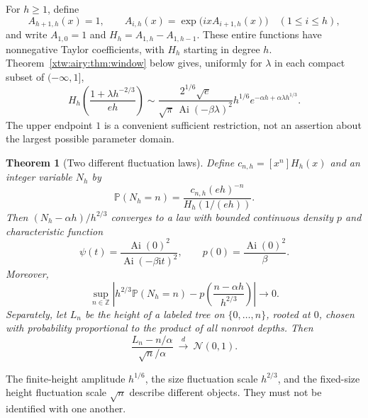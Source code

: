 \documentclass[11pt]{article}
\newtheorem{theorem}{Theorem}[section]
\theoremstyle{remark}\newtheorem{remark}[theorem]{Remark}
\newcommand{\Z}{\mathbb Z}
\newcommand{\Ai}{\operatorname{Ai}}
\newcommand{\Prb}{\mathbb P}
\begin{document}
For $h\ge1$, define
\begin{equation}\label{xtw:airy:eq:towers}
 A_{h+1,h}(x)=1,\qquad A_{i,h}(x)=\exp\bigl(ixA_{i+1,h}(x)\bigr)
 \quad(1\le i\le h),
\end{equation}
and write $A_{1,0}=1$ and $H_h=A_{1,h}-A_{1,h-1}$. These entire functions
have nonnegative Taylor coefficients, with $H_h$ starting in degree $h$.
Theorem~\ref{xtw:airy:thm:window} below gives, uniformly for $\lambda$ in each compact
subset of $(-\infty,1]$,
\begin{equation}\label{xtw:airy:eq:windowintro}
 H_h\!\left(\frac{1+\lambda h^{-2/3}}{eh}\right)
 \sim \frac{2^{1/6}\sqrt e}{\sqrt\pi\,\Ai(-\beta\lambda)^2}
       h^{1/6}e^{-\alpha h+\alpha\lambda h^{1/3}}.
\end{equation}
The upper endpoint $1$ is a convenient sufficient restriction, not an assertion
about the largest possible parameter domain.

\begin{theorem}[Two different fluctuation laws]\label{xtw:airy:thm:limitsintro}
Define $c_{n,h}=[x^n]H_h(x)$ and an integer variable $N_h$ by
\begin{equation}\label{xtw:airy:eq:sizeprobintro}
 \Prb(N_h=n)=\frac{c_{n,h}(eh)^{-n}}{H_h(1/(eh))}.
\end{equation}
Then $(N_h-\alpha h)/h^{2/3}$ converges to a law with bounded continuous density
$p$ and characteristic function
\begin{equation}\label{xtw:airy:eq:psiintro}
 \psi(t)=\frac{\Ai(0)^2}{\Ai(-\beta\mathrm i t)^2},\qquad
 p(0)=\frac{\Ai(0)^2}{\beta}.
\end{equation}
Moreover,
\begin{equation}\label{xtw:airy:eq:lltintro}
 \sup_{n\in\Z}\left|h^{2/3}\Prb(N_h=n)
 -p\!\left(\frac{n-\alpha h}{h^{2/3}}\right)\right|\longrightarrow0.
\end{equation}
Separately, let $L_n$ be the height of a labeled tree on $\{0,\ldots,n\}$,
rooted at $0$, chosen with probability proportional to the product of all
nonroot depths. Then
\begin{equation}\label{xtw:airy:eq:cltintro}
 \frac{L_n-n/\alpha}{\sqrt n/\alpha}\ \xrightarrow{d}\ \mathcal N(0,1).
\end{equation}
\end{theorem}

The finite-height amplitude $h^{1/6}$, the size fluctuation scale $h^{2/3}$,
and the fixed-size height fluctuation scale $\sqrt n$ describe different objects.
They must not be identified with one another.
\end{document}

